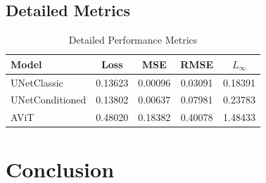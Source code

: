 \documentclass{article}
\begin{document}
\subsection{Detailed Metrics}

\begin{table}[t]
\centering
\caption{Detailed Performance Metrics}
\begin{tabular}{lcccc}
\hline
Model & Loss & MSE & RMSE & $L_\infty$ \\
\hline
UNetClassic & 0.13623 & 0.00096 & 0.03091 & 0.18391 \\
UNetConditioned & 0.13802 & 0.00637 & 0.07981 & 0.23783 \\
AViT & 0.48020 & 0.18382 & 0.40078 & 1.48433 \\
\hline
\end{tabular}
\end{table}


\section{Conclusion}




\end{document}
